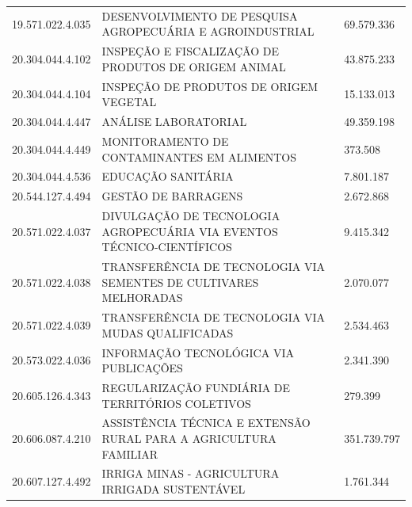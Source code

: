 \documentclass{article}
\begin{document}
\begin{longtable}[c]{m{3cm}|m{12cm}|m{2cm}}
\multicolumn{1}{C{3cm}|}{19.571.022.4.035} & \multicolumn{1}{L{12cm}|}{DESENVOLVIMENTO DE PESQUISA AGROPECUÁRIA E AGROINDUSTRIAL} & \multicolumn{1}{R{2cm}}{69.579.336} \\
\multicolumn{1}{C{3cm}|}{20.304.044.4.102} & \multicolumn{1}{L{12cm}|}{INSPEÇÃO E FISCALIZAÇÃO DE PRODUTOS DE ORIGEM ANIMAL} & \multicolumn{1}{R{2cm}}{43.875.233} \\
\multicolumn{1}{C{3cm}|}{20.304.044.4.104} & \multicolumn{1}{L{12cm}|}{INSPEÇÃO DE PRODUTOS DE ORIGEM VEGETAL} & \multicolumn{1}{R{2cm}}{15.133.013} \\
\multicolumn{1}{C{3cm}|}{20.304.044.4.447} & \multicolumn{1}{L{12cm}|}{ANÁLISE LABORATORIAL} & \multicolumn{1}{R{2cm}}{49.359.198} \\
\multicolumn{1}{C{3cm}|}{20.304.044.4.449} & \multicolumn{1}{L{12cm}|}{MONITORAMENTO DE CONTAMINANTES EM ALIMENTOS} & \multicolumn{1}{R{2cm}}{373.508} \\
\multicolumn{1}{C{3cm}|}{20.304.044.4.536} & \multicolumn{1}{L{12cm}|}{EDUCAÇÃO SANITÁRIA} & \multicolumn{1}{R{2cm}}{7.801.187} \\
\multicolumn{1}{C{3cm}|}{20.544.127.4.494} & \multicolumn{1}{L{12cm}|}{GESTÃO DE BARRAGENS} & \multicolumn{1}{R{2cm}}{2.672.868} \\
\multicolumn{1}{C{3cm}|}{20.571.022.4.037} & \multicolumn{1}{L{12cm}|}{DIVULGAÇÃO DE TECNOLOGIA AGROPECUÁRIA VIA EVENTOS TÉCNICO-CIENTÍFICOS} & \multicolumn{1}{R{2cm}}{9.415.342} \\
\multicolumn{1}{C{3cm}|}{20.571.022.4.038} & \multicolumn{1}{L{12cm}|}{TRANSFERÊNCIA DE TECNOLOGIA VIA SEMENTES DE CULTIVARES MELHORADAS} & \multicolumn{1}{R{2cm}}{2.070.077} \\
\multicolumn{1}{C{3cm}|}{20.571.022.4.039} & \multicolumn{1}{L{12cm}|}{TRANSFERÊNCIA DE TECNOLOGIA VIA MUDAS QUALIFICADAS} & \multicolumn{1}{R{2cm}}{2.534.463} \\
\multicolumn{1}{C{3cm}|}{20.573.022.4.036} & \multicolumn{1}{L{12cm}|}{INFORMAÇÃO TECNOLÓGICA VIA PUBLICAÇÕES} & \multicolumn{1}{R{2cm}}{2.341.390} \\
\multicolumn{1}{C{3cm}|}{20.605.126.4.343} & \multicolumn{1}{L{12cm}|}{REGULARIZAÇÃO FUNDIÁRIA DE TERRITÓRIOS COLETIVOS} & \multicolumn{1}{R{2cm}}{279.399} \\
\multicolumn{1}{C{3cm}|}{20.606.087.4.210} & \multicolumn{1}{L{12cm}|}{ASSISTÊNCIA TÉCNICA E EXTENSÃO RURAL PARA A AGRICULTURA FAMILIAR} & \multicolumn{1}{R{2cm}}{351.739.797} \\
\multicolumn{1}{C{3cm}|}{20.607.127.4.492} & \multicolumn{1}{L{12cm}|}{IRRIGA MINAS - AGRICULTURA IRRIGADA SUSTENTÁVEL} & \multicolumn{1}{R{2cm}}{1.761.344} \\

\end{longtable}
\end{document}
